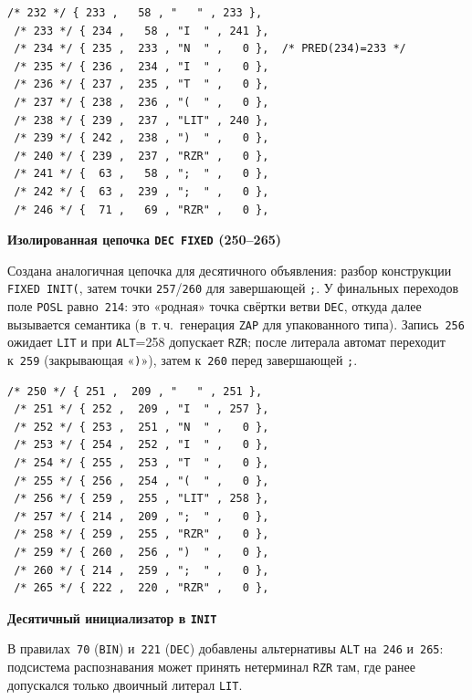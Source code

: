 \documentclass[a4paper,14pt]{extarticle}
\newcommand{\blocktitle}[1]{\par\needspace{4\baselineskip}\noindent\textbf{#1}\par\vspace{0.35\baselineskip}}
\begin{document}
\begin{lstlisting}[style=Cstyle,caption={Фрагмент цепочки 232--246 (\texttt{BIN})},label=lst:sint_bin_aux]
 /* 232 */ { 233 ,   58 , "   " , 233 },
 /* 233 */ { 234 ,   58 , "I  " , 241 },
 /* 234 */ { 235 ,  233 , "N  " ,   0 },  /* PRED(234)=233 */
 /* 235 */ { 236 ,  234 , "I  " ,   0 },
 /* 236 */ { 237 ,  235 , "T  " ,   0 },
 /* 237 */ { 238 ,  236 , "(  " ,   0 },
 /* 238 */ { 239 ,  237 , "LIT" , 240 },
 /* 239 */ { 242 ,  238 , ")  " ,   0 },
 /* 240 */ { 239 ,  237 , "RZR" ,   0 },
 /* 241 */ {  63 ,   58 , ";  " ,   0 },
 /* 242 */ {  63 ,  239 , ";  " ,   0 },
 /* 246 */ {  71 ,   69 , "RZR" ,   0 },
\end{lstlisting}

\blocktitle{Изолированная цепочка \texttt{DEC FIXED} (250--265)}

Создана аналогичная цепочка для десятичного объявления: разбор конструкции
\texttt{FIXED INIT(}, затем точки \texttt{257}/\texttt{260} для завершающей
\texttt{;}. У финальных переходов поле \texttt{POSL} равно~\texttt{214}: это
«родная» точка свёртки ветви \texttt{DEC}, откуда далее вызывается семантика
(в~т.\,ч.\ генерация \texttt{ZAP} для упакованного типа). Запись~\texttt{256}
ожидает \texttt{LIT} и при \texttt{ALT}=258 допускает \texttt{RZR}; после литерала
автомат переходит к~\texttt{259} (закрывающая «\texttt{)}»), затем к~\texttt{260}
перед завершающей \texttt{;}.

\begin{lstlisting}[style=Cstyle,caption={Фрагмент цепочки 250--265 (\texttt{DEC})},label=lst:sint_dec_aux]
 /* 250 */ { 251 ,  209 , "   " , 251 },
 /* 251 */ { 252 ,  209 , "I  " , 257 },
 /* 252 */ { 253 ,  251 , "N  " ,   0 },
 /* 253 */ { 254 ,  252 , "I  " ,   0 },
 /* 254 */ { 255 ,  253 , "T  " ,   0 },
 /* 255 */ { 256 ,  254 , "(  " ,   0 },
 /* 256 */ { 259 ,  255 , "LIT" , 258 },
 /* 257 */ { 214 ,  209 , ";  " ,   0 },
 /* 258 */ { 259 ,  255 , "RZR" ,   0 },
 /* 259 */ { 260 ,  256 , ")  " ,   0 },
 /* 260 */ { 214 ,  259 , ";  " ,   0 },
 /* 265 */ { 222 ,  220 , "RZR" ,   0 },
\end{lstlisting}

\blocktitle{Десятичный инициализатор в \texttt{INIT}}

В правилах~\texttt{70} (\texttt{BIN}) и~\texttt{221} (\texttt{DEC}) добавлены
альтернативы \texttt{ALT} на~\texttt{246} и~\texttt{265}: подсистема распознавания
может принять нетерминал \texttt{RZR} там, где ранее допускался только двоичный
литерал \texttt{LIT}.
\end{document}
